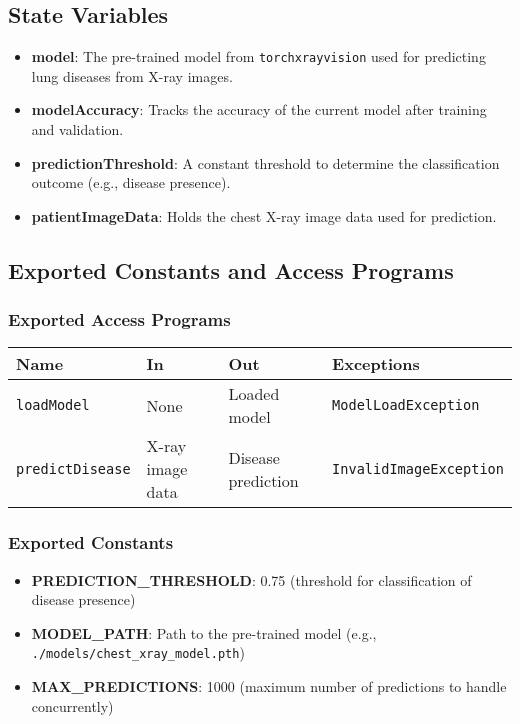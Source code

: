 \documentclass[12pt, titlepage]{article}
\begin{document}
\subsection{State Variables}
\begin{itemize}
    \item \textbf{model}: The pre-trained model from \texttt{torchxrayvision} used for predicting lung diseases from X-ray images.
    \item \textbf{modelAccuracy}: Tracks the accuracy of the current model after training and validation.
    \item \textbf{predictionThreshold}: A constant threshold to determine the classification outcome (e.g., disease presence).
    \item \textbf{patientImageData}: Holds the chest X-ray image data used for prediction.
\end{itemize}

\subsection{Exported Constants and Access Programs}
\subsubsection{Exported Access Programs}
\begin{tabular}{|l|l|l|l|}
    \hline
    \textbf{Name} & \textbf{In} & \textbf{Out} & \textbf{Exceptions} \\
    \hline
    \texttt{loadModel} & None & Loaded model & \texttt{ModelLoadException} \\
    \texttt{predictDisease} & X-ray image data & Disease prediction & \texttt{InvalidImageException} \\
    \hline
\end{tabular}

\subsubsection{Exported Constants}
\begin{itemize}
    \item \textbf{PREDICTION\_THRESHOLD}: 0.75 (threshold for classification of disease presence)
    \item \textbf{MODEL\_PATH}: Path to the pre-trained model (e.g., \texttt{./models/chest\_xray\_model.pth})
    \item \textbf{MAX\_PREDICTIONS}: 1000 (maximum number of predictions to handle concurrently)
\end{itemize}
\end{document}
